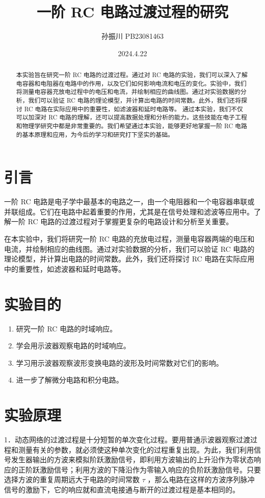\documentclass{article}
\title{\heiti\zihao{2} 一阶 RC 电路过渡过程的研究}
\author{\songti  孙振川  PB23081463  }
\date{2024.4.22}
\begin{document}
    \maketitle
    
\begin{abstract}
    本实验旨在研究一阶 RC 电路的过渡过程。通过对 RC 电路的实验，我们可以深入了解电容器和电阻器在电路中的作用，以及它们如何影响电流和电压的变化。实验中，我们将测量电容器充放电过程中的电压和电流，并绘制相应的曲线图。通过对实验数据的分析，我们可以验证 RC 电路的理论模型，并计算出电路的时间常数。此外，我们还将探讨 RC 电路在实际应用中的重要性，如滤波器和延时电路等。
    通过本实验，我们不仅可以加深对 RC 电路的理解，还可以提高数据处理和分析的能力。这些技能在电子工程和物理学研究中都是非常重要的。我们希望通过本实验，能够更好地掌握一阶 RC 电路的基本原理和应用，为今后的学习和研究打下坚实的基础。
    
\end{abstract}


\section{引言}
\label{sec:introduction}
    一阶 RC 电路是电子学中最基本的电路之一，由一个电阻器和一个电容器串联或并联组成。它们在电路中起着重要的作用，尤其是在信号处理和滤波等应用中。了解一阶 RC 电路的过渡过程对于掌握更复杂的电路设计和分析至关重要。
    
    在本实验中，我们将研究一阶 RC 电路的充放电过程，测量电容器两端的电压和电流，并绘制相应的曲线图。通过对实验数据的分析，我们可以验证 RC 电路的理论模型，并计算出电路的时间常数。此外，我们还将探讨 RC 电路在实际应用中的重要性，如滤波器和延时电路等。
    
\section{实验目的}
\begin{enumerate}
    \item 研究一阶 RC 电路的时域响应。
    \item 学会用示波器观察电路的时域响应。 
    \item 学习用示波器观察波形变换电路的波形及时间常数对它们的影响。
    \item 进一步了解微分电路和积分电路。 
\end{enumerate}

\section{实验原理}
1．动态网络的过渡过程是十分短暂的单次变化过程。要用普通示波器观察过渡过程和测量有关的参数，就必须使这种单次变化的过程重复出现。为此，我们利用信号发生器输出的方波来模拟阶跃激励信号，即利用方波输出的上升沿作为零状态响应的正阶跃激励信号；利用方波的下降沿作为零输入响应的负阶跃激励信号。只要选择方波的重复周期远大于电路的时间常数 $\tau$ ，那么电路在这样的方波序列脉冲信号的激励下，它的响应就和直流电接通与断开的过渡过程是基本相同的。
\end{document}
